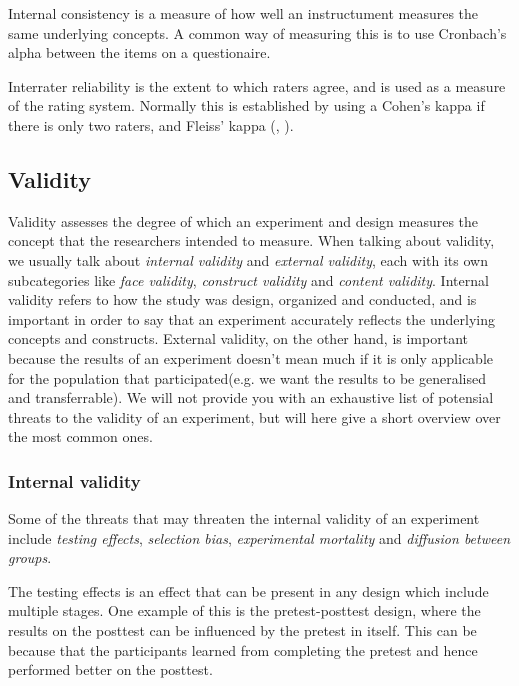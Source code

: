 	\bigskip\noindent
	Internal consistency is a measure of how well an instructument measures the same underlying concepts. A common way of measuring this is to use Cronbach's alpha between the items on a questionaire.
	
	\bigskip\noindent
	Interrater reliability is the extent to which raters agree, and is used as a measure of the rating system. Normally this is established by using a Cohen's kappa if there is only two raters, and Fleiss' kappa (\cite{gwet2001handbook}, \cite{shrout1979intraclass}).
	
\subsection*{Validity}
	Validity assesses the degree of which an experiment and design measures the concept that the researchers intended to measure.
	When talking about validity, we usually talk about \textit{internal validity} and \textit{external validity}, each with its own subcategories like \textit{face validity}, \textit{construct validity} and \textit{content validity}.
	Internal validity refers to how the study was design, organized and conducted, and is important in order to say that an experiment
 accurately reflects the underlying concepts and constructs. 
External validity, on the other hand, is important because the results of an experiment doesn't mean much if it is only applicable for the population that participated(e.g. we want the results to be generalised and transferrable).
	We will not provide you with an exhaustive list of potensial threats to the validity of an experiment, but will here give a short overview over the most common ones.
	
	\subsubsection{Internal validity}
	Some of the threats that may threaten the internal validity of an experiment include \textit{testing effects}, \textit{selection bias}, \textit{experimental mortality} and \textit{diffusion between groups}.
	
	\bigskip\noindent
	The testing effects is an effect that can be present in any design which include multiple stages. 
	One example of this is the pretest-posttest design, where the results on the posttest can be influenced by the pretest in itself. 
	This can be because that the participants learned from completing the pretest and hence performed better on the posttest.
	
